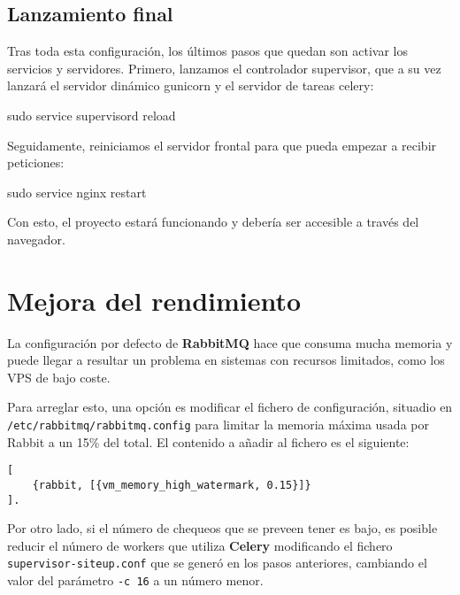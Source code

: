\subsection{Lanzamiento final}

Tras toda esta configuración, los últimos pasos que quedan son activar los
servicios y servidores. Primero, lanzamos el controlador supervisor, que a su
vez lanzará el servidor dinámico gunicorn y el servidor de tareas celery:

\begin{bashcode}
sudo service supervisord reload  
\end{bashcode}

Seguidamente, reiniciamos el servidor frontal para que pueda empezar a recibir
peticiones:

\begin{bashcode}
sudo service nginx restart  
\end{bashcode}

Con esto, el proyecto estará funcionando y debería ser accesible a través del
navegador.


\section{Mejora del rendimiento}

La configuración por defecto de \textbf{RabbitMQ} hace que consuma mucha memoria
y puede llegar a resultar un problema en sistemas con recursos limitados, como
los VPS de bajo coste.

Para arreglar esto, una opción es modificar el fichero de configuración,
situadio en \texttt{/etc/rabbitmq/rabbitmq.config} para limitar la memoria
máxima usada por Rabbit a un 15\% del total. El contenido a añadir al fichero es
el siguiente:

\begin{verbatim}
[
    {rabbit, [{vm_memory_high_watermark, 0.15}]}
].  
\end{verbatim}

Por otro lado, si el número de chequeos que se preveen tener es bajo, es posible
reducir el número de workers que utiliza \textbf{Celery} modificando el fichero
\texttt{supervisor-siteup.conf} que se generó en los pasos anteriores, cambiando
el valor del parámetro \texttt{-c 16} a un número menor.


